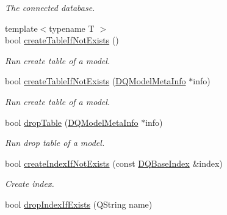 \begin{DoxyCompactItemize}
\begin{DoxyCompactList}\small\item\em The connected database. \item\end{DoxyCompactList}\item 
\hypertarget{classDQSql_aca4cb6dfbf49f5be9cb7a6e692005426}{
{\footnotesize template$<$typename T $>$ }\\bool \hyperlink{classDQSql_aca4cb6dfbf49f5be9cb7a6e692005426}{createTableIfNotExists} ()}
\label{classDQSql_aca4cb6dfbf49f5be9cb7a6e692005426}

\begin{DoxyCompactList}\small\item\em Run create table of a model. \item\end{DoxyCompactList}\item 
\hypertarget{classDQSql_a0538378e28c40b653f547f14b5ce99c0}{
bool \hyperlink{classDQSql_a0538378e28c40b653f547f14b5ce99c0}{createTableIfNotExists} (\hyperlink{classDQModelMetaInfo}{DQModelMetaInfo} $\ast$info)}
\label{classDQSql_a0538378e28c40b653f547f14b5ce99c0}

\begin{DoxyCompactList}\small\item\em Run create table of a model. \item\end{DoxyCompactList}\item 
\hypertarget{classDQSql_a9b78c90e7b0001864e768ea678009e29}{
bool \hyperlink{classDQSql_a9b78c90e7b0001864e768ea678009e29}{dropTable} (\hyperlink{classDQModelMetaInfo}{DQModelMetaInfo} $\ast$info)}
\label{classDQSql_a9b78c90e7b0001864e768ea678009e29}

\begin{DoxyCompactList}\small\item\em Run drop table of a model. \item\end{DoxyCompactList}\item 
\hypertarget{classDQSql_ab074c10f1c25e61380fabe5515d6ddb7}{
bool \hyperlink{classDQSql_ab074c10f1c25e61380fabe5515d6ddb7}{createIndexIfNotExists} (const \hyperlink{classDQBaseIndex}{DQBaseIndex} \&index)}
\label{classDQSql_ab074c10f1c25e61380fabe5515d6ddb7}

\begin{DoxyCompactList}\small\item\em Create index. \item\end{DoxyCompactList}\item 
\hypertarget{classDQSql_a9b389328d6ebf381aaca8befc722f5cb}{
bool \hyperlink{classDQSql_a9b389328d6ebf381aaca8befc722f5cb}{dropIndexIfExists} (QString name)}
\label{classDQSql_a9b389328d6ebf381aaca8befc722f5cb}


\end{DoxyCompactItemize}
